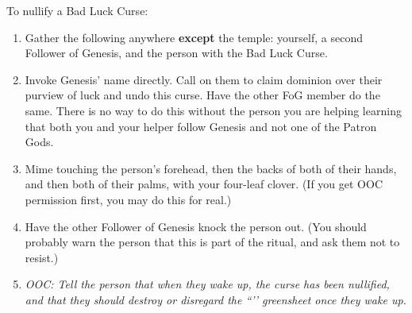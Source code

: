 \documentclass[green]{GL2020}
\begin{document}
To nullify a Bad Luck Curse:
\begin{enumerate}
  \item Gather the following anywhere \textbf{except} the temple: yourself, a second Follower of Genesis, and the person with the Bad Luck Curse.
  \item Invoke Genesis' name directly. Call on them to claim dominion over their purview of luck and undo this curse. Have the other FoG member do the same. There is no way to do this without the person you are helping learning that both you and your helper follow Genesis and not one of the Patron Gods.
  \item Mime touching the person’s forehead, then the backs of both of their hands, and then both of their palms, with your four-leaf clover. (If you get OOC permission first, you may do this for real.)
  \item Have the other Follower of Genesis knock the person out. (You should probably warn the person that this is part of the ritual, and ask them not to resist.)
	\item \emph{OOC: Tell the person that when they wake up, the curse has been nullified, and that they should destroy or disregard the ``\gBadLuckCurse{}’’ greensheet once they wake up.}
\end{enumerate}
  
\end{document}
